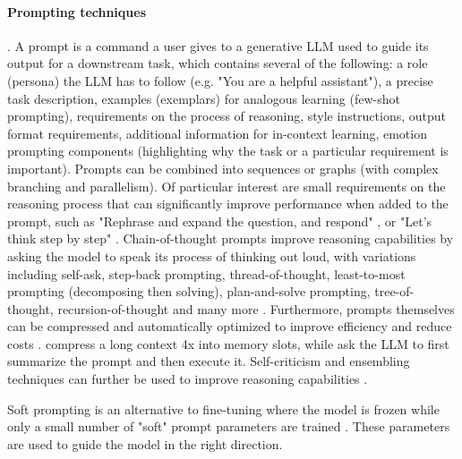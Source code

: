 \documentclass[10pt]{article}
\begin{document}
\paragraph{Prompting techniques}. A prompt is a command a user gives to a generative LLM used to guide its output for a downstream task, which contains several of the following: a role (persona) the LLM has to follow (e.g. "You are a helpful assistant"), a precise task description, examples (exemplars) for analogous learning (few-shot prompting), requirements on the process of reasoning, style instructions, output format requirements, additional information for in-context learning, emotion prompting components (highlighting why the task or a particular requirement is important). Prompts can be combined into sequences or graphs (with complex branching and parallelism). Of particular interest are small requirements on the reasoning process that can significantly improve performance when added to the prompt, such as "Rephrase and expand the question, and respond" \cite{}, or "Let’s think step by step" \cite{kojima2022}. Chain-of-thought prompts improve reasoning capabilities by asking the model to speak its process of thinking out loud, with variations including self-ask, step-back prompting, thread-of-thought, least-to-most prompting (decomposing then solving), plan-and-solve prompting, tree-of-thought, recursion-of-thought and many more \cite{schulhoff2024prompt}. 
Furthermore, prompts themselves can be compressed and automatically optimized to improve efficiency and reduce costs \cite{chang2024efficient}. \cite{ge2023context} compress a long context 4x into memory slots, while \cite{weston2023system} ask the LLM to first summarize the prompt and then execute it. Self-criticism and ensembling techniques can further be used to improve reasoning capabilities \cite{schulhoff2024prompt}. 

Soft prompting is an alternative to fine-tuning where the model is frozen while only a small number of "soft" prompt parameters are trained \cite{lester2021prompt}. These parameters are used to guide the model in the right direction.
\end{document}

